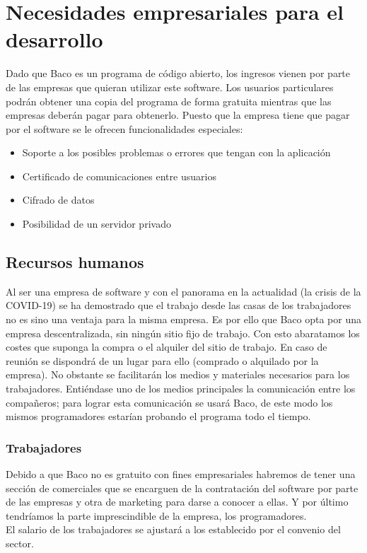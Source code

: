 \documentclass[12pt, a4paper]{book} %
\begin{document}
	\chapter{Necesidades empresariales para el desarrollo}
	Dado que Baco es un programa de código abierto, los ingresos vienen por parte de las empresas que quieran utilizar este software. Los usuarios particulares podrán obtener una copia del programa de forma gratuita mientras que las empresas deberán pagar para obtenerlo. Puesto que la empresa tiene que pagar por el software se le ofrecen funcionalidades especiales:
	\begin{itemize}
		\item Soporte a los posibles problemas o errores que tengan con la aplicación
		\item Certificado de comunicaciones entre usuarios
		\item Cifrado de datos
		\item Posibilidad de un servidor privado
	\end{itemize}
		\section{Recursos humanos}
		Al ser una empresa de software y con el panorama en la actualidad (la crisis de la COVID-19) se ha demostrado que el trabajo desde las casas de los trabajadores no es sino una ventaja para la misma empresa. Es por ello que Baco opta por una empresa descentralizada, sin ningún sitio fijo de trabajo. Con esto abaratamos los costes que suponga la compra o el alquiler del sitio de trabajo. En caso de reunión se dispondrá de un lugar para ello (comprado o alquilado por la empresa). No obstante se facilitarán los medios y materiales necesarios para los trabajadores. Entiéndase uno de los medios principales la comunicación entre los compañeros; para lograr esta comunicación se usará Baco, de este modo los mismos programadores estarían probando el programa todo el tiempo.
			\subsection{Trabajadores}
			Debido a que Baco no es gratuito con fines empresariales habremos de tener una sección de comerciales que se encarguen de la contratación del software por parte de las empresas y otra de marketing para darse a conocer a ellas. Y por último tendríamos la parte imprescindible de la empresa, los programadores.\\
			El salario de los trabajadores se ajustará a los establecido por el convenio del sector.
\end{document}
